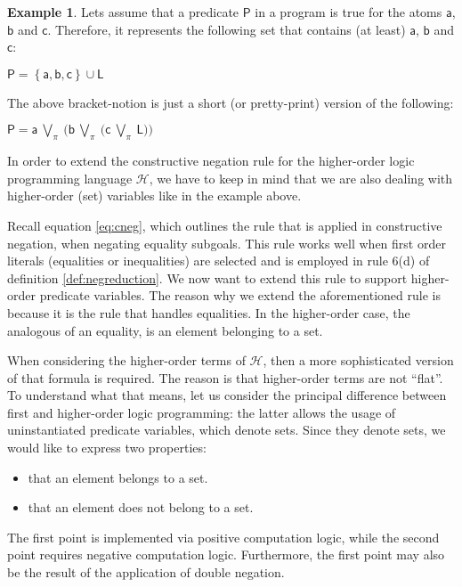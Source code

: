 \documentclass[inscr,ack,preface]{dithesis}
\theoremstyle{definition}
\newtheorem{example}{Example}[chapter]
\newcommand{\h}{$\mathcal{H}$}
\newcommand{\msf}[1]{$\mathsf{#1}$}
\begin{document}
\begin{example} Lets assume that a predicate \msf{P} in a program is true for the atoms \msf{a}, \msf{b} and \msf{c}. Therefore, it represents the following set that contains (at least) \msf{a}, \msf{b} and \msf{c}:
\begin{center}
  \msf{P = \left\{ a, b, c \right\} \cup L}
\end{center}

The above bracket-notion is just a short (or pretty-print) version of the following:
\begin{center}
  \msf{P = a ~\bigvee_{\pi}~ \big( b ~\bigvee_{\pi}~ \big( c ~\bigvee_{\pi}~ L \big) \big)}
\end{center}
\end{example}

In order to extend the constructive negation rule for the higher-order logic programming language \h{}, we have to keep in mind that we are also dealing with higher-order (set) variables like in the example above.

Recall equation \ref{eq:cneg}, which outlines the rule that is applied in constructive negation, when negating equality subgoals. This rule works well when first order literals (equalities or inequalities) are selected and is employed in rule 6(d) of definition \ref{def:negreduction}. We now want to extend this rule to support higher-order predicate variables. The reason why we extend the aforementioned rule is because it is the rule that handles equalities. In the higher-order case, the analogous of an equality, is an element belonging to a set.

When considering the higher-order terms of \h{}, then a more sophisticated version of that formula is required. The reason is that higher-order terms are not ``flat''. To understand what that means, let us consider the principal difference between first and higher-order logic programming: the latter allows the usage of uninstantiated predicate variables, which denote sets. Since they denote sets, we would like to express two properties:
\begin{itemize}
  \item that an element belongs to a set.
  \item that an element does not belong to a set.
\end{itemize}
The first point is implemented via positive computation logic, while the second point requires negative computation logic. Furthermore, the first point may also be the result of the application of double negation.
\end{document}
